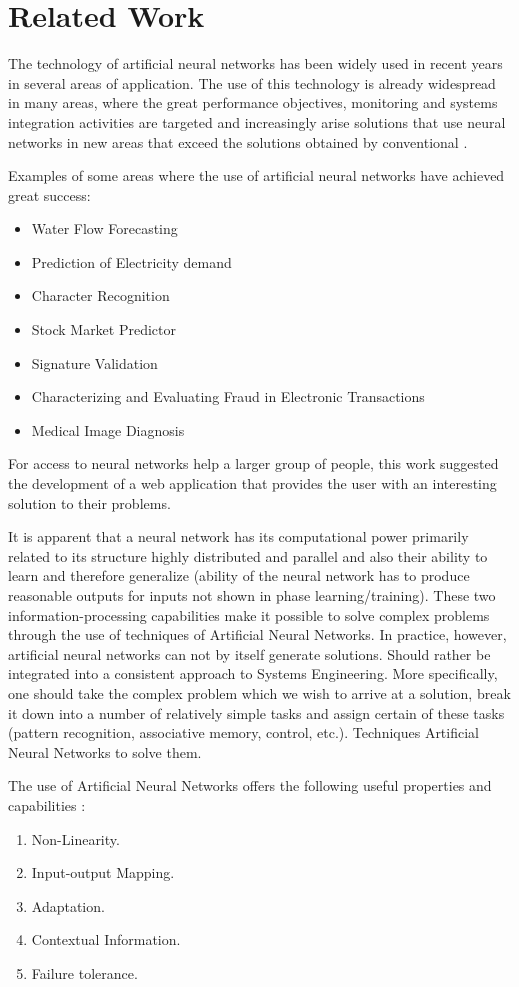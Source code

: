\section{Related Work}

The technology of artificial neural networks has been widely used in recent 
years in several areas of application. The use of this technology is already 
widespread in many areas, where the great performance objectives, monitoring and 
systems integration activities are targeted and increasingly arise solutions 
that use neural networks in new areas that exceed the solutions obtained by 
conventional \cite{1327478}.

Examples of some areas where the use of artificial neural networks have achieved 
great success:

\begin{itemize}
\item Water Flow Forecasting \cite{1556318}
\item Prediction of Electricity demand \cite{4679182}
\item Character Recognition \cite{5726693}
\item Stock Market Predictor \cite{5715226}
\item Signature Validation \cite{549040}
\item Characterizing and Evaluating Fraud in Electronic Transactions 
\cite{6392147}
\item Medical Image Diagnosis \cite{5953960}
\end{itemize}

For access to neural networks help a larger group of people, this work suggested 
the development of a web application that provides the user with an interesting 
solution to their problems.

It is apparent that a neural network has its computational power primarily 
related to its structure highly distributed and parallel and also their ability 
to learn and therefore generalize (ability of the neural network has to 
produce reasonable outputs for inputs not shown in phase learning/training). 
These two information-processing capabilities make it possible to solve complex 
problems through the use of techniques of Artificial Neural Networks. In 
practice, however, artificial neural networks can not by itself generate 
solutions. Should rather be integrated into a consistent approach to Systems 
Engineering. More specifically, one should take the complex problem which we 
wish to arrive at a solution, break it down into a number of relatively simple 
tasks and assign certain of these tasks (pattern recognition, associative 
memory, control, etc.). Techniques Artificial Neural Networks to solve them.

The use of Artificial Neural Networks offers the following useful properties and 
capabilities \cite{Bishop2005}:

\begin{enumerate}[I]
\item Non-Linearity.
\item Input-output Mapping.
\item Adaptation.
\item Contextual Information.
\item Failure tolerance.
\end{enumerate}